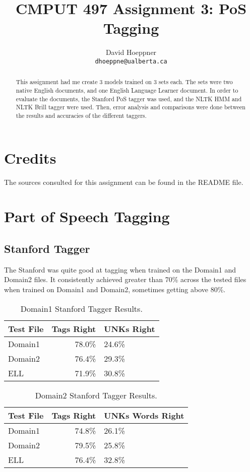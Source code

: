 \documentclass[11pt,a4paper]{article}
\title{CMPUT 497 Assignment 3: PoS Tagging}
\author{David Hoeppner\\
  {\tt dhoeppne@ualberta.ca} \\
  }
\date{}
\begin{document}
\maketitle
\begin{abstract}
  This assignment had me create 3 models trained on 3 sets each. The
  sets were two native English documents, and one English Language
  Learner document. In order to evaluate the documents, the Stanford
  PoS tagger was used, and the NLTK HMM and NLTK Brill tagger were
  used. Then, error analysis and comparisons were done between the
  results and accuracies of the different taggers.
\end{abstract}

\section{Credits}

The sources consulted for this assignment can be found in the README
file.

\section{Part of Speech Tagging}
\subsection{Stanford Tagger}

The Stanford was quite good at tagging when trained on the Domain1
and Domain2 files. It consistently achieved greater than 70\% across
the tested files when trained on Domain1 and Domain2, sometimes getting
above 80\%.

\begin{table}[h]
  \begin{center}
  \begin{tabular}{|l|rl|}
  \hline \bf Test File & \bf Tags Right & \bf UNKs Right \\ \hline
  Domain1 & 78.0\% & 24.6\% \\
  Domain2 & 76.4\% & 29.3\% \\
  ELL  & 71.9\% & 30.8\% \\
  \hline
  \end{tabular}
  \end{center}
  \caption{\label{d1St-table} Domain1 Stanford Tagger Results. }
\end{table}

\begin{table}[h]
  \begin{center}
  \begin{tabular}{|l|rl|}
  \hline \bf Test File & \bf Tags Right & \bf UNKs Words Right \\ \hline
  Domain1 & 74.8\% & 26.1\% \\
  Domain2 & 79.5\% & 25.8\% \\
  ELL  & 76.4\% & 32.8\% \\
  \hline
  \end{tabular}
  \end{center}
  \caption{\label{d2St-table} Domain2 Stanford Tagger Results. }
\end{table}
\end{document}
